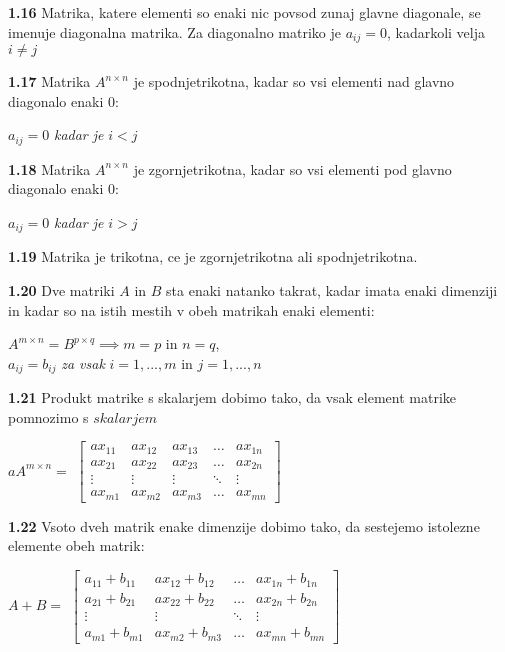 \documentclass{article}
\begin{document}
\begin{multicols}{3}
\textbf{1.16} Matrika, katere elementi so enaki nic povsod
zunaj glavne diagonale, se imenuje diagonalna matrika. Za
diagonalno matriko je $a_{ij} = 0$, kadarkoli velja $i \neq j$

\textbf{1.17} Matrika $A^{n \times n}$ je spodnjetrikotna, kadar
so vsi elementi nad glavno diagonalo enaki 0:
\begin{center}
    $a_{ij} = 0$  \textit{kadar je} $i < j$
\end{center}

\textbf{1.18} Matrika $A^{n \times n}$ je zgornjetrikotna, kadar
so vsi elementi pod glavno diagonalo enaki 0:
\begin{center}
    $a_{ij} = 0$  \textit{kadar je} $i > j$
\end{center}

\textbf{1.19} Matrika je trikotna, ce je zgornjetrikotna ali spodnjetrikotna.

\textbf{1.20} Dve matriki $A$ in $B$ sta enaki natanko takrat,
kadar imata enaki dimenziji in kadar so na istih mestih v obeh
matrikah enaki elementi:
\begin{center}
    $A^{m \times n} = B^{p \times q} \implies m=p$ in $n=q$,\\
    $a_{ij} = b_{ij}$ \textit{za vsak} $i= 1,...,m$ in $j=1,...,n$ 
\end{center}

\textbf{1.21} Produkt matrike s skalarjem dobimo tako, da 
vsak element matrike pomnozimo s $skalarjem$
\begin{center}
    $aA^{m \times n} =$
    $\begin{bmatrix}
        ax_{11} & ax_{12} & ax_{13} & \dots  & ax_{1n} \\
        ax_{21} & ax_{22} & ax_{23} & \dots  & ax_{2n} \\
        \vdots  & \vdots  & \vdots  & \ddots  & \vdots \\
        ax_{m1} & ax_{m2} & ax_{m3} & \dots  & ax_{mn}
    \end{bmatrix}$
\end{center}

\textbf{1.22} Vsoto dveh matrik enake dimenzije dobimo tako,
da sestejemo istolezne elemente obeh matrik:
\begin{center}
    $A + B =$
    $\begin{bmatrix}
        a_{11} + b_{11} & ax_{12} + b_{12}  & \dots  & ax_{1n} + b_{1n} \\
        a_{21} + b_{21} & ax_{22} + b_{22}  & \dots  & ax_{2n} + b_{2n}\\
        \vdots          & \vdots            & \ddots & \vdots \\
        a_{m1} + b_{m1} & ax_{m2} + b_{m3} & \dots  & ax_{mn} + b_{mn}
    \end{bmatrix}$
\end{center}


\end{multicols}
\end{document}

